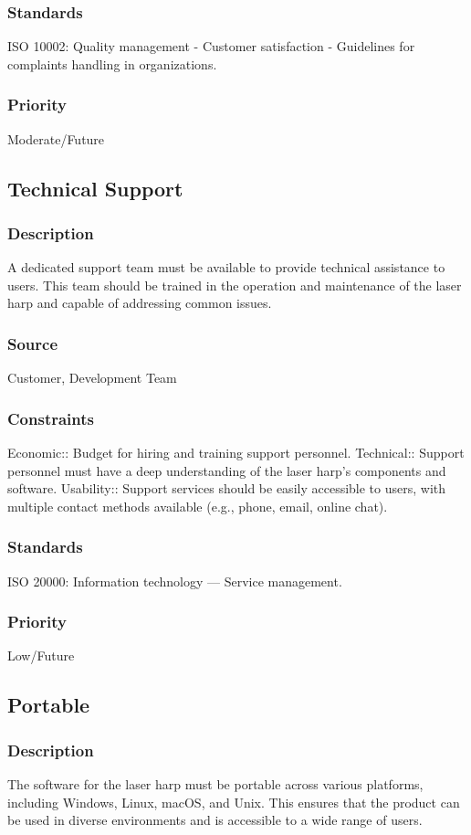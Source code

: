 \subsubsection{Standards}
ISO 10002: Quality management - Customer satisfaction - Guidelines for complaints handling in organizations.
\subsubsection{Priority}
Moderate/Future


\subsection{Technical Support}
\subsubsection{Description}
A dedicated support team must be available to provide technical assistance to users. This team should be trained in the operation and maintenance of the laser harp and capable of addressing common issues.
\subsubsection{Source}
Customer, Development Team
\subsubsection{Constraints}Economic:: Budget for hiring and training support personnel.
Technical:: Support personnel must have a deep understanding of the laser harp's components and software.
Usability:: Support services should be easily accessible to users, with multiple contact methods available (e.g., phone, email, online chat).
\subsubsection{Standards}
ISO 20000: Information technology — Service management.
\subsubsection{Priority}
Low/Future


\subsection{Portable}
\subsubsection{Description}
The software for the laser harp must be portable across various platforms, including Windows, Linux, macOS, and Unix. This ensures that the product can be used in diverse environments and is accessible to a wide range of users.

